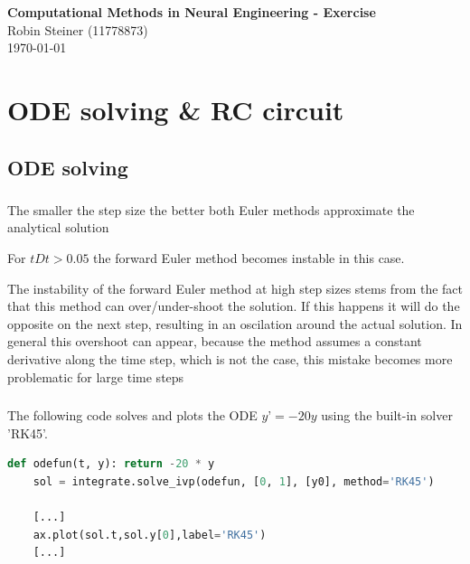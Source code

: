 \documentclass{article}
\begin{document}
    \begin{center}
        \textbf{\Large Computational Methods in Neural Engineering - Exercise} \\
        \vspace{0.2cm}
        Robin Steiner (11778873)\\
        \vspace{0.2cm}
        \today \\
    \end{center}


    \section{ODE solving \& RC circuit}

    \subsection{ODE solving}

    \subsubsection{}
    The smaller the step size the better both Euler methods approximate the analytical solution

    \vspace{10pt}
    For $tDt > 0.05$ the forward Euler method becomes instable in this case.

    \vspace{10pt}
    The instability of the forward Euler method at high step sizes stems from the fact that this method can over/under-shoot the solution.
    If this happens it will do the opposite on the next step, resulting in an oscilation around the actual solution.
    In general this overshoot can appear, because the method assumes a constant derivative along the time step, which is not the case,
    this mistake becomes more problematic for large time steps

    \subsubsection{}
    The following code solves and plots the ODE $y’=-20y$ using the built-in solver 'RK45'.
    \begin{lstlisting}[language=Python, style=mystyle]
    def odefun(t, y): return -20 * y
    sol = integrate.solve_ivp(odefun, [0, 1], [y0], method='RK45')

    [...]
    ax.plot(sol.t,sol.y[0],label='RK45')
    [...]
    \end{lstlisting}
\end{document}
